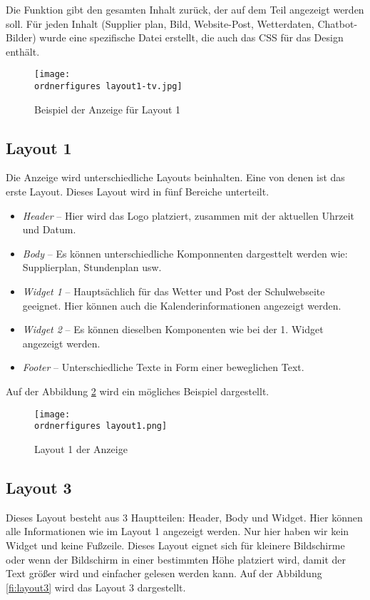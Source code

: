 Die Funktion gibt den gesamten Inhalt zurück, der auf dem Teil angezeigt werden soll. Für jeden Inhalt (Supplier plan, Bild, Website-Post, Wetterdaten, Chatbot-Bilder) wurde eine spezifische Datei erstellt, die auch das CSS für das Design enthält.

\begin{figure}[H]
	\centering
	\texttt{[image: \\ordnerfigures layout1-tv.jpg]}
	\caption{Beispiel der Anzeige für Layout 1}
	\label{fi:layout1}
\end{figure}


\subsection{Layout 1}
Die Anzeige wird unterschiedliche Layouts beinhalten. Eine von denen ist das erste Layout. Dieses Layout wird in fünf Bereiche unterteilt.

\begin{itemize}
	\item \textit{Header} – Hier wird das Logo platziert, zusammen mit der aktuellen Uhrzeit und Datum.
	\item \textit{Body} – Es können unterschiedliche Komponnenten dargesttelt werden wie: Supplierplan, Stundenplan usw.
	\item \textit{Widget 1} – Hauptsächlich für das Wetter und Post der Schulwebseite geeignet. Hier können auch die Kalenderinformationen angezeigt werden.
	\item \textit{Widget 2} – Es können dieselben Komponenten wie bei der 1. Widget angezeigt werden.
	\item \textit{Footer} – Unterschiedliche Texte in Form einer beweglichen Text.
	
\end{itemize}

Auf der Abbildung \ref{fi:layout1} wird ein mögliches Beispiel dargestellt.

\begin{figure}[H]
	\centering
	\texttt{[image: \\ordnerfigures layout1.png]}
	\caption{Layout 1 der Anzeige}
	\label{fi:layout1}
\end{figure}

\subsection{Layout 3}
Dieses Layout besteht aus 3 Hauptteilen: Header, Body und Widget. Hier können alle Informationen wie im Layout 1 angezeigt werden. Nur hier haben wir kein Widget und keine Fußzeile. Dieses Layout eignet sich für kleinere Bildschirme oder wenn der Bildschirm in einer bestimmten Höhe platziert wird, damit der Text größer wird und einfacher gelesen werden kann. Auf der Abbildung \ref{fi:layout3} wird das Layout 3 dargestellt.

